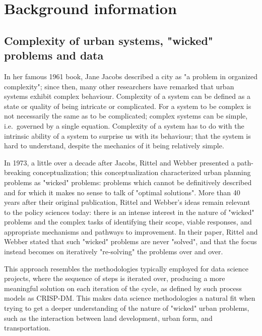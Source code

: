 \chapter[Background information]{Background information} \label{ch:background}

\section{Complexity of urban systems, "wicked" problems and data} \label{sec:complexity_and_wicked_problems_and_data}

In her famous 1961 book, Jane Jacobs\cite{Jacobs1961} described a city as "a problem in organized complexity";
since then, many other researchers have remarked that urban systems exhibit complex behaviour\cite{Batty2008, Bettencourt2013}.
Complexity of a system can be defined as a state or quality of being intricate or complicated.
For a system to be complex is not necessarily the same as to be complicated;
complex systems can be simple, i.e.\ governed by a single equation.
Complexity of a system has to do with the intrinsic ability of a system to surprise us with its behaviour;
that the system is hard to understand, despite the mechanics of it being relatively simple.

In 1973, a little over a decade after Jacobs, Rittel and Webber\cite{Rittel1973} presented a path-breaking conceptualization;
this conceptualization characterized urban planning problems as "wicked" problems: problems which cannot be definitively described and for which it makes no sense to talk of "optimal solutions".
More than 40 years after their original publication, Rittel and Webber's ideas remain relevant to the policy sciences today: there is an intense interest in the nature of "wicked" problems and the complex tasks of identifying their scope, viable responses, and appropriate mechanisms and pathways to improvement\cite{Crowley2017}.
In their paper, Rittel and Webber stated that such "wicked" problems are never "solved", and that the focus instead becomes on iteratively "re-solving" the problems over and over.

This approach resembles the methodologies typically employed for data science projects, where the sequence of steps is iterated over, producing a more meaningful solution on each iteration of the cycle, as defined by such process models as CRISP-DM\cite{Shearer2000}.
This makes data science methodologies a natural fit when trying to get a deeper understanding of the nature of "wicked" urban problems, such as the interaction between land development, urban form, and transportation.

